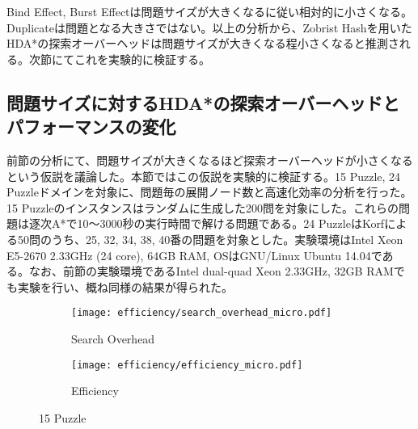 \documentclass[uplatex]{jsarticle}
\begin{document}
Bind Effect, Burst Effectは問題サイズが大きくなるに従い相対的に小さくなる。Duplicateは問題となる大きさではない。以上の分析から、Zobrist Hashを用いたHDA*の探索オーバーヘッドは問題サイズが大きくなる程小さくなると推測される。次節にてこれを実験的に検証する。


\subsection{問題サイズに対するHDA*の探索オーバーヘッドとパフォーマンスの変化}
\label{sec:speedup_size}
前節の分析にて、問題サイズが大きくなるほど探索オーバーヘッドが小さくなるという仮説を議論した。本節ではこの仮説を実験的に検証する。15 Puzzle, 24 Puzzleドメインを対象に、問題毎の展開ノード数と高速化効率の分析を行った。15 Puzzleのインスタンスはランダムに生成した200問を対象にした。これらの問題は逐次A*で10～3000秒の実行時間で解ける問題である。24 PuzzleはKorfによる50問のうち、25, 32, 34, 38, 40番の問題を対象とした\cite{Korf2002}。実験環境はIntel Xeon E5-2670 2.33GHz (24 core), 64GB RAM, OSはGNU/Linux Ubuntu 14.04である。なお、前節の実験環境であるIntel dual-quad Xeon 2.33GHz, 32GB RAMでも実験を行い、概ね同様の結果が得られた。

\begin{figure}[h]
	\centering
	\begin{subfigure}{0.45\columnwidth}
		\texttt{[image: efficiency/search\_overhead\_micro.pdf]}	
		\caption{Search Overhead}
		\label{fig:david_so}
	\end{subfigure}
	\begin{subfigure}{0.45\columnwidth}
		\texttt{[image: efficiency/efficiency\_micro.pdf]}	
		\caption{Efficiency}
		\label{fig:david_speedup}
	\end{subfigure}
	\caption{15 Puzzle}
	\label{fig:15_david}
\end{figure}

\begin{comment}
\begin{figure}[h]
	\centering
	\begin{subfigure}{0.45\columnwidth}
		\texttt{[image: efficiency/search\_overhead\_24puzzle\_micro.pdf]}	
		\caption{Search Overhead}
		\label{fig:david_so_24}
	\end{subfigure}
	\begin{subfigure}{0.45\columnwidth}
		\texttt{[image: efficiency/efficiency\_24puzzle\_micro.pdf]}	
		\caption{Efficiency}
		\label{fig:david_speedup_24}
	\end{subfigure}
	\caption{24 Puzzle}
	\label{fig:24_david}
\end{figure}
\end{comment}
\end{document}
